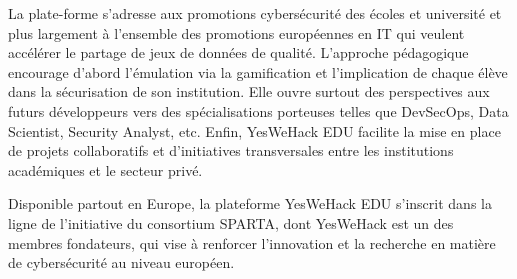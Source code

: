 La plate-forme s’adresse aux promotions cybersécurité des écoles et université et plus largement à l’ensemble des promotions européennes en IT qui veulent accélérer le partage de jeux de données de qualité. L’approche pédagogique encourage d’abord l’émulation via la gamification et l’implication de chaque élève dans la sécurisation de son institution. Elle ouvre surtout des perspectives aux futurs développeurs vers des spécialisations porteuses telles que DevSecOps, Data Scientist, Security Analyst, etc. Enfin, YesWeHack EDU facilite la mise en place de projets collaboratifs et d’initiatives transversales entre les institutions académiques et le secteur privé.

Disponible partout en Europe, la plateforme YesWeHack EDU s’inscrit dans la ligne de l’initiative du consortium SPARTA, dont YesWeHack est un des membres fondateurs, qui vise à renforcer l’innovation et la recherche en matière de cybersécurité au niveau européen.